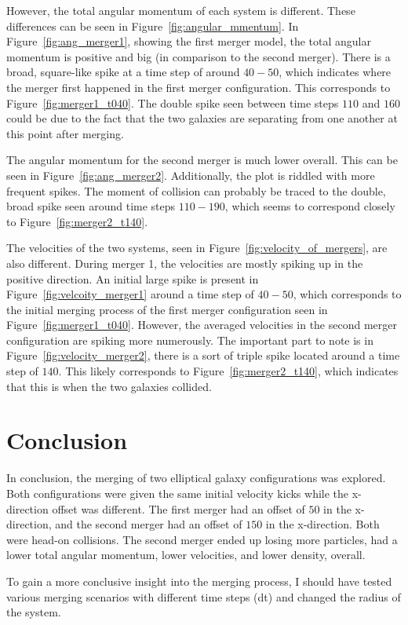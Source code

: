 \documentclass[12pt]{report}
\begin{document}
However, the total angular momentum of each system is different. These differences can be seen in Figure~\ref{fig:angular_mmentum}. In Figure~\ref{fig:ang_merger1}, showing the first merger model, the total angular momentum is positive and big (in comparison to the second merger). There is a broad, square-like spike at a time step of around $40-50$, which indicates where the merger first happened in the first merger configuration. This corresponds to 
Figure~\ref{fig:merger1_t040}. The double spike seen between time steps $110$ and $160$ could be due to the fact that the two galaxies are separating from one another at this point after merging.

The angular momentum for the second merger is much lower overall. This can be seen in Figure~\ref{fig:ang_merger2}. Additionally, the plot is riddled with more frequent spikes. The moment of collision can probably be traced to the double, broad spike seen around time steps $110-190$, which seems to correspond closely to Figure~\ref{fig:merger2_t140}. 

The velocities of the two systems, seen in Figure~\ref{fig:velocity_of_mergers}, are also different. During merger 1, the velocities are mostly spiking up in the positive direction. An initial large spike is present in Figure~\ref{fig:velcoity_merger1} around a time step of $40-50$, which corresponds to the initial merging process of the first merger configuration seen in Figure~\ref{fig:merger1_t040}. However, the averaged velocities in the second merger configuration are spiking more numerously. The important part to note is in Figure~\ref{fig:velocity_merger2}, there is a sort of triple spike located around a time step of $140$. This likely corresponds to Figure~\ref{fig:merger2_t140}, which indicates that this is when the two galaxies collided.

\section*{Conclusion}

In conclusion, the merging of two elliptical galaxy configurations was explored. Both configurations were given the same initial velocity kicks while the x-direction offset was different. The first merger had an offset of $50$ in the x-direction, and the second merger had an offset of $150$ in the x-direction. Both were head-on collisions. The second merger ended up losing more particles, had a lower total angular momentum, lower velocities, and lower density, overall.

To gain a more conclusive insight into the merging process, I should have tested various merging scenarios with different time steps (dt) and changed the radius of the system.




\end{document}
